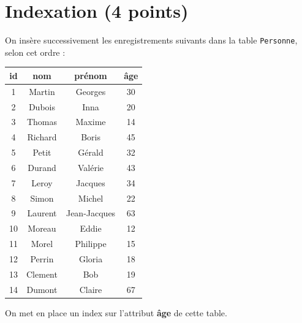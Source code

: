 \section{Indexation (4 points)}


On insère successivement les enregistrements suivants dans la table 
\texttt{Personne}, selon cet ordre :

\begin{center}
\begin{small}
\begin{tabular}{c|c|c|c}
\textbf{id} & \textbf{nom} & \textbf{prénom} & \textbf{âge} \\
\hline
\hline
1 & Martin & Georges & 30\\
\hline
2 & Dubois & Inna & 20 \\
\hline
3 & Thomas & Maxime & 14\\
\hline
4 & Richard & Boris & 45\\
\hline
5 & Petit & Gérald & 32\\
\hline
6 & Durand & Valérie & 43\\
\hline
7 & Leroy & Jacques & 34 \\
\hline
8 & Simon & Michel & 22 \\
\hline
9 & Laurent & Jean-Jacques & 63\\
\hline
10 & Moreau & Eddie & 12\\
\hline
11 & Morel & Philippe & 15\\
\hline
12 & Perrin & Gloria & 18 \\
\hline
13 & Clement & Bob & 19\\
\hline
14 & Dumont  &  Claire & 67\\
\hline
\end{tabular}
\end{small}
\end{center}

On met en place un index sur l'attribut \textbf{âge} de cette table. 

